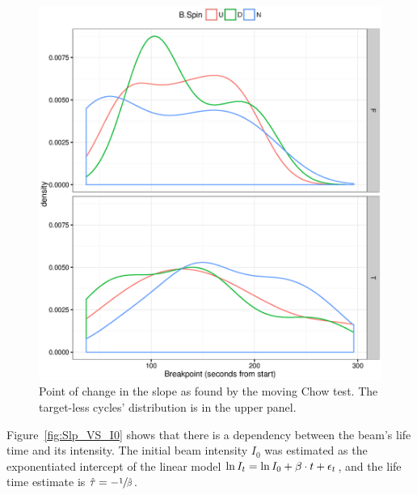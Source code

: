 \documentclass{article}
\begin{document}
\begin{figure}
	\centering
	\includegraphics{FStats_BP_dens.eps}
	\caption{Point of change in the slope as found by the moving Chow test. The target-less cycles' distribution is in the upper panel.\label{FStat_BP_dens}}
\end{figure}

Figure~\ref{fig:Slp_VS_I0} shows that there is a dependency between the beam's life time and its intensity. The initial beam intensity $I_0$ was estimated as the exponentiated intercept of the linear model $\ln I_t = \ln I_0 + \slp\cdot t + \err_t$, and the life time estimate is $\hat{\tau} = -\sfrac{1}{\slp*}$. 
\end{document}
